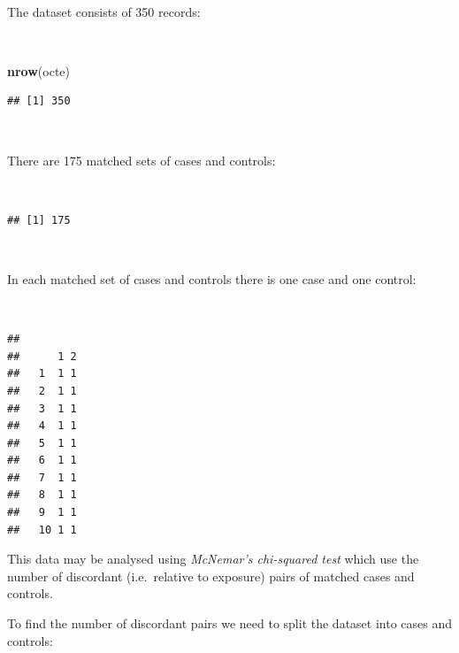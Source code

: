 \documentclass[12pt,a4paper]{book}
\newenvironment{Shaded}{\begin{snugshade}}{\end{snugshade}}
\newcommand{\KeywordTok}[1]{\textcolor[rgb]{0.13,0.29,0.53}{\textbf{#1}}}
\newcommand{\OperatorTok}[1]{\textcolor[rgb]{0.81,0.36,0.00}{\textbf{#1}}}
\newcommand{\NormalTok}[1]{#1}
\theoremstyle{definition}
\theoremstyle{definition}
\theoremstyle{definition}
\theoremstyle{remark}
\begin{document}
~

The dataset consists of 350 records:

~

\begin{Shaded}
\begin{Highlighting}[]
\KeywordTok{nrow}\NormalTok{(octe)}
\end{Highlighting}
\end{Shaded}

\begin{verbatim}
## [1] 350
\end{verbatim}

~

There are 175 matched sets of cases and controls:

~

\begin{Shaded}
\end{Shaded}

\begin{verbatim}
## [1] 175
\end{verbatim}

~

In each matched set of cases and controls there is one case and one
control:

~

\begin{Shaded}
\end{Shaded}

\begin{verbatim}
##     
##      1 2
##   1  1 1
##   2  1 1
##   3  1 1
##   4  1 1
##   5  1 1
##   6  1 1
##   7  1 1
##   8  1 1
##   9  1 1
##   10 1 1
\end{verbatim}

\newpage

This data may be analysed using \emph{McNemar's chi-squared test} which
use the number of discordant (i.e.~relative to exposure) pairs of
matched cases and controls.

To find the number of discordant pairs we need to split the dataset into
cases and controls:
\end{document}
